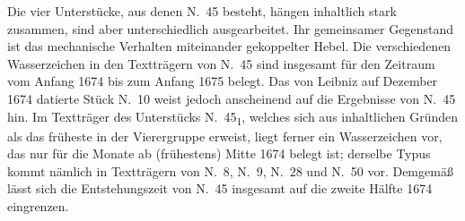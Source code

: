\footnotesize%
\pstart%
\noindent%
Die vier Unterstücke, aus denen N.~45 besteht, hängen inhaltlich stark zusammen, sind aber unterschied\-lich ausgearbeitet.
Ihr gemeinsamer Gegenstand ist das mechanische Verhalten miteinander gekoppelter Hebel.
Die verschiedenen Wasserzeichen in den Textträgern von N.~45 sind insgesamt für den Zeitraum vom Anfang 1674 bis zum Anfang 1675 belegt.
Das von Leibniz auf Dezember 1674 datierte Stück N.~10 weist jedoch anscheinend auf die Ergebnisse von N.~45 hin.
Im Textträger des Unterstücks N.~45\textsubscript{1}, welches sich aus inhaltlichen Gründen als das früheste in der Vierergruppe erweist,
liegt ferner ein Wasserzeichen vor, das nur für die Monate ab (frühestens) Mitte 1674 belegt ist;
derselbe Typus kommt nämlich in Text\-trägern von N.~8, N.~9, N.~28 und N.~50 vor.
Demgemäß lässt sich die Entstehungszeit von N.~45 ins\-ge\-samt auf die zweite Hälfte 1674 eingrenzen.

\pend
\normalsize
%
%
%
%
%
